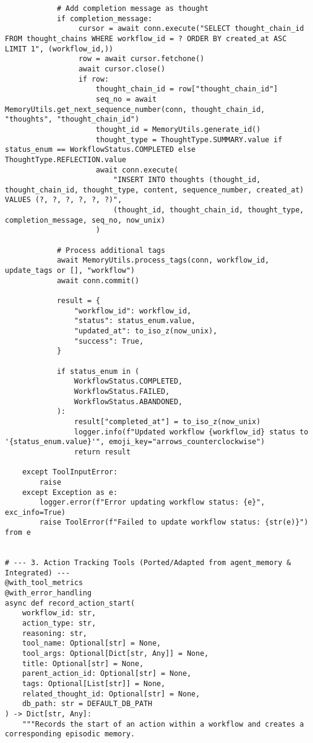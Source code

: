 \documentclass[12pt,a4paper]{article}
\begin{document}
\begin{pageablecode}
\begin{verbatim}
            # Add completion message as thought
            if completion_message:
                 cursor = await conn.execute("SELECT thought_chain_id FROM thought_chains WHERE workflow_id = ? ORDER BY created_at ASC LIMIT 1", (workflow_id,))
                 row = await cursor.fetchone()
                 await cursor.close()
                 if row:
                     thought_chain_id = row["thought_chain_id"]
                     seq_no = await MemoryUtils.get_next_sequence_number(conn, thought_chain_id, "thoughts", "thought_chain_id")
                     thought_id = MemoryUtils.generate_id()
                     thought_type = ThoughtType.SUMMARY.value if status_enum == WorkflowStatus.COMPLETED else ThoughtType.REFLECTION.value
                     await conn.execute(
                         "INSERT INTO thoughts (thought_id, thought_chain_id, thought_type, content, sequence_number, created_at) VALUES (?, ?, ?, ?, ?, ?)",
                         (thought_id, thought_chain_id, thought_type, completion_message, seq_no, now_unix)
                     )

            # Process additional tags
            await MemoryUtils.process_tags(conn, workflow_id, update_tags or [], "workflow")
            await conn.commit()

            result = {
                "workflow_id": workflow_id,
                "status": status_enum.value,
                "updated_at": to_iso_z(now_unix),
                "success": True,
            }

            if status_enum in (
                WorkflowStatus.COMPLETED,
                WorkflowStatus.FAILED,
                WorkflowStatus.ABANDONED,
            ):
                result["completed_at"] = to_iso_z(now_unix)
                logger.info(f"Updated workflow {workflow_id} status to '{status_enum.value}'", emoji_key="arrows_counterclockwise")
                return result

    except ToolInputError:
        raise
    except Exception as e:
        logger.error(f"Error updating workflow status: {e}", exc_info=True)
        raise ToolError(f"Failed to update workflow status: {str(e)}") from e
    

# --- 3. Action Tracking Tools (Ported/Adapted from agent_memory & Integrated) ---
@with_tool_metrics
@with_error_handling
async def record_action_start(
    workflow_id: str,
    action_type: str,
    reasoning: str,
    tool_name: Optional[str] = None,
    tool_args: Optional[Dict[str, Any]] = None,
    title: Optional[str] = None,
    parent_action_id: Optional[str] = None,
    tags: Optional[List[str]] = None,
    related_thought_id: Optional[str] = None,
    db_path: str = DEFAULT_DB_PATH
) -> Dict[str, Any]:
    """Records the start of an action within a workflow and creates a corresponding episodic memory.


\end{verbatim}
\end{pageablecode}
\end{document}
